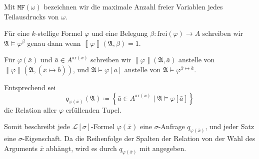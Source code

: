 Mit $\mathtt{MF}\left(\omega\right)$ bezeichnen wir die maximale
Anzahl freier Variablen jedes Teilausdrucks von $\omega$.
\begin{defn}
Für eine $k$-stellige Formel $\varphi$ und eine Belegung $\beta:\mathrm{frei}\left(\varphi\right)\rightarrow A$
schreiben wir $\mathfrak{A}\models\varphi^{\beta}$ genau dann wenn
$\left\llbracket \varphi\right\rrbracket \left(\mathfrak{A},\beta\right)=1$.

Für $\varphi\left(\bar{x}\right)$ und $\bar{a}\in A^{\mathrm{ar}\left(\bar{x}\right)}$
schreiben wir $\left\llbracket \varphi\right\rrbracket \left(\mathfrak{A},\bar{a}\right)$
anstelle von $\left\llbracket \varphi\right\rrbracket \left(\mathfrak{A},\left(\bar{x}\mapsto\bar{b}\right)\right)$,
und $\mathfrak{A}\models\varphi\left[\bar{a}\right]$ anstelle von
$\mathfrak{A}\models\varphi^{\bar{x}\mapsto\bar{a}}$.

Entsprechend sei 
\[
q_{\varphi\left(\bar{x}\right)}\left(\mathfrak{A}\right)\coloneqq\left\{ \bar{a}\in A^{\mathrm{ar}\left(\bar{x}\right)}\mid\mathfrak{A}\models\varphi\left[\bar{a}\right]\right\} 
\]
die Relation aller $\varphi$ erfüllenden Tupel.
\end{defn}
Somit beschreibt jede $\mathcal{L}\left[\sigma\right]$-Formel $\varphi\left(\bar{x}\right)$
eine $\sigma$-Anfrage $q_{\varphi\left(\bar{x}\right)}$, und jeder
Satz eine $\sigma$-Eigenschaft. Da die Reihenfolge der Spalten der
Relation von der Wahl des Arguments $\bar{x}$ abhängt, wird es durch
$q_{\varphi\left(\bar{x}\right)}$ mit angegeben.

